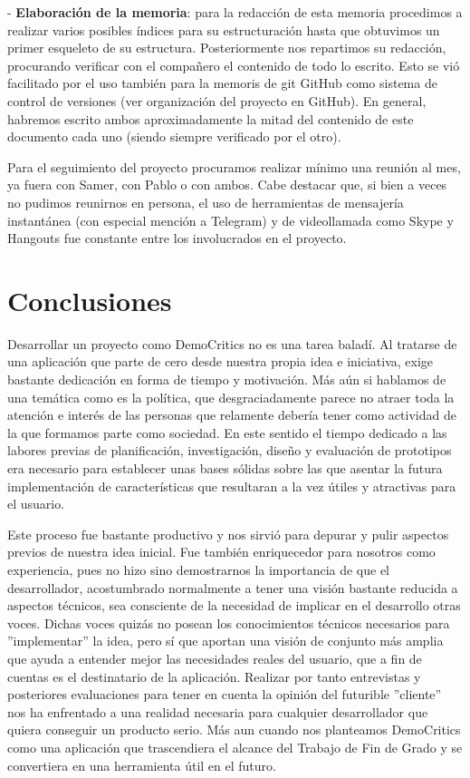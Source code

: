 - \textbf{Elaboración de la memoria}: para la redacción de esta memoria procedimos a realizar varios posibles índices para su estructuración hasta que obtuvimos un primer esqueleto de su estructura. Posteriormente nos repartimos su redacción, procurando verificar con el compañero el contenido de todo lo escrito. Esto se vió facilitado por el uso también para la memoris de git  GitHub como sistema de control de versiones (ver organización del proyecto en GitHub). En general, habremos escrito ambos aproximadamente la mitad del contenido de este documento cada uno (siendo siempre verificado por el otro).

Para el seguimiento del proyecto procuramos realizar mínimo una reunión al mes, ya fuera con Samer, con Pablo o con ambos. Cabe destacar que, si bien a veces no pudimos reunirnos en persona, el uso de herramientas de mensajería instantánea (con especial mención a Telegram) y de videollamada como Skype y Hangouts fue constante entre los involucrados en el proyecto.

\section{Conclusiones}

Desarrollar un proyecto como DemoCritics no es una tarea baladí. Al tratarse de una aplicación que parte de cero desde nuestra propia idea e iniciativa, exige bastante dedicación en forma de tiempo y motivación. Más aún si hablamos de una temática como es la política, que desgraciadamente parece no atraer toda la atención e interés de las personas que relamente debería tener como actividad de la que formamos parte como sociedad. En este sentido el tiempo dedicado a las labores previas de planificación, investigación, diseño y evaluación de prototipos era necesario para establecer unas bases sólidas sobre las que asentar la futura implementación de características que resultaran a la vez útiles y atractivas para el usuario.

Este proceso fue bastante productivo y nos sirvió para depurar y pulir aspectos previos de nuestra idea inicial. Fue también enriquecedor para nosotros como experiencia, pues no hizo sino demostrarnos la importancia de que el desarrollador, acostumbrado normalmente a tener una visión   bastante reducida a aspectos técnicos, sea consciente de la necesidad de implicar en el desarrollo otras voces. Dichas voces quizás no posean los conocimientos técnicos necesarios para ''implementar'' la idea, pero sí que aportan una visión de conjunto más amplia que ayuda a entender mejor las necesidades reales del usuario, que a fin de cuentas es el destinatario de la aplicación. Realizar por tanto entrevistas y posteriores evaluaciones para tener en cuenta la opinión del futurible ''cliente'' nos ha enfrentado a una realidad necesaria para cualquier desarrollador que quiera conseguir un producto serio. Más aun cuando nos planteamos DemoCritics como una aplicación que trascendiera el alcance del Trabajo de Fin de Grado y se convertiera en una herramienta útil en el futuro.

